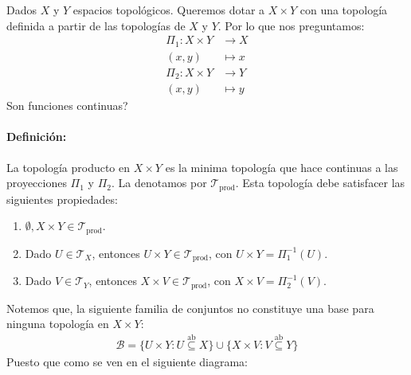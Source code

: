 Dados $X$ y $Y$ espacios topológicos. Queremos dotar a $X \times Y$ con una topología definida a partir de las topologías de $X$ y $Y$. Por lo que nos preguntamos:
\begin{align*}
        \Pi_1\colon X \times Y &\to X\\
        (x,y) &\mapsto x\\
        \Pi_2\colon X \times Y &\to Y\\
        (x,y) &\mapsto y
\end{align*}
Son funciones continuas?

\paragraph{Definición:} La topología producto en $X \times Y$ es la minima topología que hace continuas a las proyecciones $\Pi_1$ y $\Pi_2$.  La denotamos por $\mathcal T_{\text{prod}}$. Esta topología debe satisfacer las siguientes propiedades:  

\begin{enumerate}
    \item $\emptyset,X \times Y \in \mathcal T_{\text{prod}}$.
    \item Dado $U \in \mathcal T_X$, entonces $U \times Y \in \mathcal T_{\text{prod}}$,  con $U \times Y = \Pi_1^{-1}(U)$.
    \item Dado $V \in \mathcal T_Y$, entonces $X \times V \in \mathcal T_{\text{prod}}$,  con $X \times V = \Pi_2^{-1}(V)$.
\end{enumerate}

Notemos que, la siguiente familia de conjuntos no constituye una base para ninguna topología en $X \times Y$:
\begin{align*}
    \mathcal B = \{
        U \times Y : U \overset{\text{ab}}{\subseteq} X\} \cup \{X \times V : V \overset{\text{ab}}{\subseteq} Y\}
\end{align*}
Puesto que como se ven en el siguiente diagrama:

